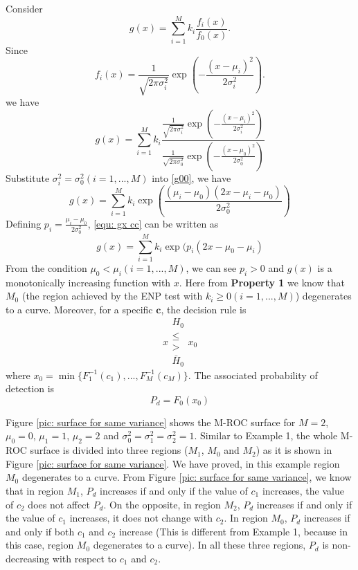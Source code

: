 Consider
\begin{equation}
\label{equ: define gx}
g(x) = \sum_{i=1}^{M}k_i\frac{f_i(x)}{f_0(x)}.
\end{equation}
Since 
\begin{equation}
\label{equ: gaussian PDF}
f_i(x) = \frac{1}{\sqrt{2\pi\sigma_i^2}}\exp(-\frac{(x-\mu_i)^2}{2\sigma_i^2}).
\end{equation}
we have
\begin{equation}
\label{g00}
g(x) = \sum_{i=1}^{M}k_i\frac{\frac{1}{\sqrt{2\pi\sigma_i^2}}\exp(-\frac{(x-\mu_i)^2}{2\sigma_i^2})}{\frac{1}{\sqrt{2\pi\sigma_0^2}}\exp(-\frac{(x-\mu_0)^2}{2\sigma_0^2})}
\end{equation}
Substitute  $\sigma_i^2 = \sigma_0^2 (i = 1, ..., M)$ into \eqref{g00}, we have 
\begin{equation}
\label{equ: gx cc}
g(x) = \sum_{i=1}^{M}k_i\exp(\frac{(\mu_i - \mu_0)(2x-\mu_i - \mu_0)}{2\sigma_0^2})
\end{equation}
Defining $p_i = \frac{\mu_i - \mu_0}{2\sigma_0^2}$, \eqref{equ: gx cc} can be written as
\begin{equation}
g(x) = \sum_{i=1}^{M}k_i\exp(p_i(2x-\mu_0 - \mu_i)
\end{equation}
From the condition $\mu_0 < \mu_i (i=1, ..., M)$, we can see $p_i >0$ and  $g(x)$ is a monotonically increasing function with $x$. Here from \textbf{Property 1} we know that $M_0$ (the region achieved by the ENP test with $k_i \geq 0 (i=1, ..., M)$) degenerates to a curve. Moreover, for a specific $\mathbf{c}$, the decision rule is 
\[
x \substack{H_0 \\ \leq \\ > \\ \bar{H}_0} x_0
\]
where $x_0 = \min\{F_1^{-1}(c_1), ..., F_M^{-1}(c_M)\}$. The associated probability of detection is
\[
P_d = F_0(x_0)
\]

Figure \ref{pic: surface for same variance} shows the M-ROC surface for $M=2$, $\mu_0 = 0$, $\mu_1 = 1$, $\mu_2 = 2$ and $\sigma_0^2 = \sigma_1^2 = \sigma_2^2 = 1$. 
Similar to Example 1, the whole M-ROC surface is divided into three regions ($M_1$, $M_0$ and $M_2$) as it is shown in Figure \ref{pic: surface for same variance}.  We have proved, in this example region $M_0$ degenerates to a curve.  
From Figure \ref{pic: surface for same variance}, we know that in region $M_1$, $P_d$ increases if and only if the value of $c_1$ increases, the value of $c_2$ does not affect $P_d$. On the opposite, in region $M_2$, $P_d$ increases if and only if the value of $c_1$ increases, it does not change with $c_2$. In region $M_0$, $P_d$ increases if and only if both $c_1$ and $c_2$ increase (This is different from Example 1, because in this case, region $M_0$ degenerates to a curve). 
In all these three regions, $P_d$ is non-decreasing with respect to $c_1$ and $c_2$. 

